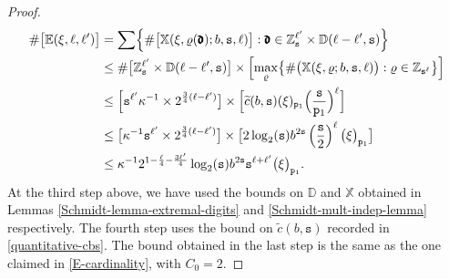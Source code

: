 \documentclass[12pt, twoside]{article}
\theoremstyle{definition}
\numberwithin{equation}{section}
\begin{document}
\begin{proof}
\begin{align*}
\# \bigl[ \mathbb E(\xi, \ell, \ell')\bigr] &= \sum \Bigl\{\# \bigl[ \mathbb X(\xi, \varrho(\pmb{\mathfrak d}); b, \mathtt s, \ell)\bigr] : \pmb{\mathfrak d} \in \mathbb Z_{\mathtt s}^{\ell'} \times \mathbb D(\ell - \ell', \mathtt s) \Bigr\} \\  
&\leq \# \bigl[ \mathbb Z_{\mathtt s}^{\ell'} \times \mathbb D(\ell - \ell', \mathtt s) \bigr] \times \Bigl[ \max_{\varrho}\bigl\{\#\bigl(\mathbb X(\xi, \varrho; b, \mathtt s, \ell)\bigr) : \varrho \in \mathbb Z_{\mathtt s^{\ell}} \bigr\} \Bigr] \\ &\leq  \Bigl[ \mathtt s^{\ell'} \kappa^{-1} \times 2^{\frac{3}{4} (\ell - \ell')} \bigr] \times \Bigl[ \widetilde{c}(b, \mathtt s) (\xi)_{\mathtt p_1} \Bigl(\frac{\mathtt s}{\mathtt p_1}\Bigr)^{\ell} \Bigr] \\ 
&\leq \bigl[ \kappa^{-1} \mathtt s^{\ell'} \times 2^{\frac{3}{4}(\ell - \ell')} \bigr] \times \bigl[ 2 \log_2(\mathtt s) b^{2 \mathtt s} \left(\frac{\mathtt s}{2}\right)^{\ell} \bigl(\xi\bigr)_{\mathtt p_1} \bigr] \\ &\leq \kappa^{-1} 2^{1 - \frac{\ell}{4} - \frac{3 \ell'}{4}} \log_2(\mathtt s) b^{2 \mathtt s} \mathtt s^{\ell + \ell'} \bigl( \xi \bigr)_{\mathtt p_1}. 
\end{align*}
At the third step above, we have used the bounds on $\mathbb D$ and $\mathbb X$ obtained in Lemmas \ref{Schmidt-lemma-extremal-digits} and \ref{Schmidt-mult-indep-lemma} respectively. The fourth step uses the bound on $\widetilde{c}(b, \mathtt s)$ recorded in \eqref{quantitative-cbs}. The bound obtained in the last step is the same as the one claimed in \eqref{E-cardinality}, with $C_0 =2$. 
\end{proof}
\end{document}

